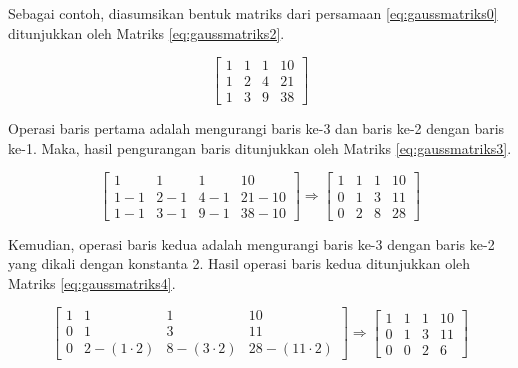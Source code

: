 Sebagai contoh, diasumsikan bentuk matriks dari persamaan \ref{eq:gaussmatriks0} ditunjukkan oleh Matriks \ref{eq:gaussmatriks2}.

\begin{center}
	\setlength\arraycolsep{10pt}
	\begin{equation}
		\begin{bmatrix}
				1 	& 1 	& 1 	& 10 		\\[1em]
				1 	& 2 	& 4 	& 21 		\\[1em]
				1 	& 3 	& 9 	& 38
		\end{bmatrix} \label{eq:gaussmatriks2}
	\end{equation}
\end{center}

Operasi baris pertama adalah mengurangi baris ke-3 dan baris ke-2 dengan baris ke-1. Maka, hasil pengurangan baris ditunjukkan oleh Matriks \ref{eq:gaussmatriks3}.

\begin{center}
	\setlength\arraycolsep{10pt}
	\begin{equation}
		\begin{bmatrix}
				1 			& 1 		& 1 		& 10 				\\[1em]
				1 - 1 	& 2 - 1	& 4 - 1	& 21 - 10		\\[1em]
				1 - 1		& 3 - 1	& 9 - 1	& 38 - 10
		\end{bmatrix} \Rightarrow
		\begin{bmatrix}
				1 	& 1 	& 1 	& 10 		\\[1em]
				0 	& 1 	& 3 	& 11 		\\[1em]
				0 	& 2 	& 8 	& 28
		\end{bmatrix} \label{eq:gaussmatriks3}
	\end{equation}
\end{center}

Kemudian, operasi baris kedua adalah mengurangi baris ke-3 dengan baris ke-2 yang dikali dengan konstanta 2. Hasil operasi baris kedua ditunjukkan oleh Matriks \ref{eq:gaussmatriks4}.

\begin{center}
	\setlength\arraycolsep{10pt}
	\begin{equation}
		\begin{bmatrix}
				1 	& 1 							& 1 							& 10 		\\[1em]
				0 	& 1 							& 3 							& 11 		\\[1em]
				0 	& 2 - (1\cdot2) 	& 8 - (3\cdot2) 	& 28 - (11\cdot2)
		\end{bmatrix} \Rightarrow
		\begin{bmatrix}
				1 	& 1 	& 1 	& 10 		\\[1em]
				0 	& 1 	& 3 	& 11 		\\[1em]
				0 	& 0 	& 2 	& 6
		\end{bmatrix} \label{eq:gaussmatriks4}
	\end{equation}
\end{center}

